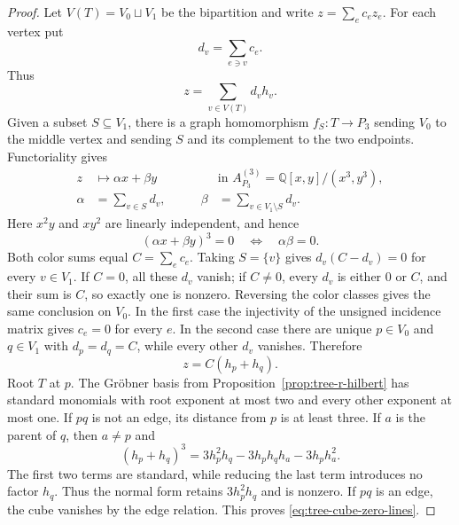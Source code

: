 \documentclass[11pt]{amsart}
\theoremstyle{plain}
\theoremstyle{definition}
\theoremstyle{remark}
\newcommand{\Q}{\mathbb{Q}}
\begin{document}
\begin{proof}
Let $V(T)=V_0\sqcup V_1$ be the bipartition and write
$z=\sum_e c_ez_e$.  For each vertex put
\[
  d_v=\sum_{e\ni v}c_e.
\]
Thus
\[
  z=\sum_{v\in V(T)}d_vh_v.
\]
Given a subset $S\subseteq V_1$, there is a graph homomorphism
$f_S:T\to P_3$ sending $V_0$ to the middle vertex and sending $S$ and its
complement to the two endpoints.  Functoriality gives
\[
  \begin{aligned}
    z&\longmapsto \alpha x+\beta y
      &&\text{in }A_{P_3}^{(3)}=\Q[x,y]/(x^3,y^3),\\
    \alpha&=\sum_{v\in S}d_v,
      &\qquad \beta&=\sum_{v\in V_1\setminus S}d_v.
  \end{aligned}
\]
Here $x^2y$ and $xy^2$ are linearly independent, and hence
\[
  (\alpha x+\beta y)^3=0
  \quad\Longleftrightarrow\quad
  \alpha\beta=0.
\]
Both color sums equal $C=\sum_e c_e$.  Taking $S=\{v\}$ gives
$d_v(C-d_v)=0$ for every $v\in V_1$.  If $C=0$, all these $d_v$ vanish; if
$C\ne0$, every $d_v$ is either $0$ or $C$, and their sum is $C$, so exactly
one is nonzero.  Reversing the color classes gives the same conclusion on
$V_0$.  In the first case the injectivity of the unsigned incidence matrix
gives $c_e=0$ for every $e$.  In the second case there are unique
$p\in V_0$ and $q\in V_1$ with $d_p=d_q=C$, while every other $d_v$ vanishes.
Therefore
\[
  z=C(h_p+h_q).
\]
Root $T$ at $p$.  The Gr\"obner basis from
Proposition~\ref{prop:tree-r-hilbert} has standard monomials with root
exponent at most two and every other exponent at most one.  If $pq$ is not
an edge, its distance from $p$ is at least three.  If $a$ is the parent of
$q$, then $a\ne p$ and
\[
  (h_p+h_q)^3
  =3h_p^2h_q-3h_ph_qh_a-3h_ph_a^2.
\]
The first two terms are standard, while reducing the last term introduces no
factor $h_q$.  Thus the normal form retains $3h_p^2h_q$ and is nonzero.  If
$pq$ is an edge, the cube vanishes by the edge relation.  This proves
\eqref{eq:tree-cube-zero-lines}.


\end{proof}
\end{document}
